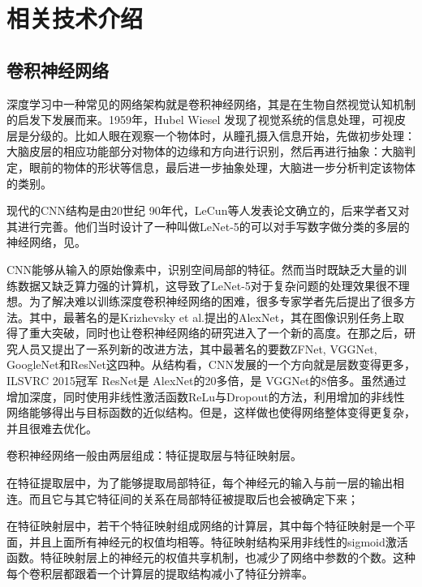 
\chapter{相关技术介绍}

\section{卷积神经网络}

深度学习中一种常见的网络架构就是卷积神经网络，其是在生物自然视觉认知机制的启发下发展而来。1959年，Hubel  Wiesel  发现了视觉系统的信息处理，可视皮层是分级的。比如人眼在观察一个物体时，从瞳孔摄入信息开始，先做初步处理：大脑皮层的相应功能部分对物体的边缘和方向进行识别，然后再进行抽象：大脑判定，眼前的物体的形状等信息，最后进一步抽象处理，大脑进一步分析判定该物体的类别。

现代的CNN结构是由20世纪 90年代，LeCun等人发表论文确立的，后来学者又对其进行完善。他们当时设计了一种叫做LeNet-5的可以对手写数字做分类的多层的神经网络，见\cite{LeNet}。

CNN能够从输入的原始像素中，识别空间局部的特征。然而当时既缺乏大量的训练数据又缺乏算力强的计算机，这导致了LeNet-5对于复杂问题的处理效果很不理想。为了解决难以训练深度卷积神经网络的困难，很多专家学者先后提出了很多方法。其中，最著名的是Krizhevsky et al.提出的AlexNet\cite{AlexNet}，其在图像识别任务上取得了重大突破，同时也让卷积神经网络的研究进入了一个新的高度。在那之后，研究人员又提出了一系列新的改进方法，其中最著名的要数ZFNet\cite{ZFNet}, VGGNet\cite{VGG}, GoogleNet\cite{Google}和ResNet\cite{Resnet}这四种。从结构看，CNN发展的一个方向就是层数变得更多，ILSVRC 2015冠军 ResNet\cite{Resnet}是 AlexNet\cite{AlexNet}的20多倍，是 VGGNet\cite{VGG}的8倍多。虽然通过增加深度，同时使用非线性激活函数ReLu与Dropout的方法，利用增加的非线性网络能够得出与目标函数的近似结构。但是，这样做也使得网络整体变得更复杂，并且很难去优化。

卷积神经网络一般由两层组成：特征提取层与特征映射层。

在特征提取层中，为了能够提取局部特征，每个神经元的输入与前一层的输出相连。而且它与其它特征间的关系在局部特征被提取后也会被确定下来；

在特征映射层中，若干个特征映射组成网络的计算层，其中每个特征映射是一个平面，并且上面所有神经元的权值均相等。特征映射结构采用非线性的sigmoid激活函数。特征映射层上的神经元的权值共享机制，也减少了网络中参数的个数。这种每个卷积层都跟着一个计算层的提取结构减小了特征分辨率。



